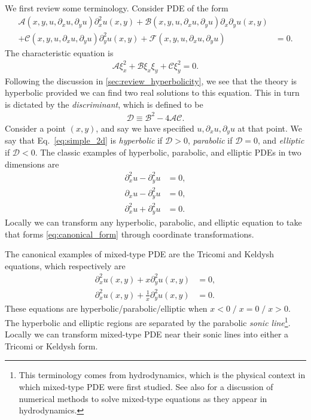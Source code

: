 \documentclass{ws-ijmpd}
\begin{document}
We first review some terminology\cite{evans2010partial}.
Consider PDE of the form
\begin{align}
\label{eq:simple_2d}
   \mathcal{A}\left(x,y,u,\partial_xu,\partial_yu\right)\partial_x^2u(x,y)
   +
   \mathcal{B}\left(x,y,u,\partial_xu,\partial_yu\right)\partial_x\partial_yu(x,y)
   &
   \nonumber\\
   +
   \mathcal{C}\left(x,y,u,\partial_xu,\partial_yu\right)\partial_y^2u(x,y)
   +
   \mathcal{F}\left(x,y,u,\partial_xu,\partial_yu\right)
   &=
   0
   .
\end{align}
The characteristic equation is
\begin{align}
   \mathcal{A}\xi_x^2
   +
   \mathcal{B}\xi_x\xi_y
   +
   \mathcal{C}\xi_y^2
   =
   0
   .
\end{align}
Following the discussion in \ref{sec:review_hyperbolicity}, we see that
the theory is hyperbolic provided we can find two real solutions to this
equation.
This in turn is dictated by the \emph{discriminant}, which is defined to be
\begin{align}
   \mathcal{D}
   \equiv
   \mathcal{B}^2
   -
   4\mathcal{A}\mathcal{C}
   .
\end{align}
Consider a point $(x,y)$, and say we have specified
$u,\partial_xu,\partial_yu$ at that point.
We say that Eq.~\eqref{eq:simple_2d} is
\emph{hyperbolic} if $\mathcal{D}>0$, \emph{parabolic} if $\mathcal{D}=0$,
and \emph{elliptic} if $\mathcal{D}<0$.
The classic examples of hyperbolic, parabolic, and elliptic PDEs in two
dimensions are
\begin{subequations}
\label{eq:canonical_form}
\begin{align}
   \partial_x^2u - \partial_y^2u
   &=
   0
   ,\\
   \partial_xu - \partial_y^2u
   &=
   0
   ,\\
   \partial_x^2u + \partial_y^2u
   &=
   0
   .
\end{align}
\end{subequations}
Locally we can transform any hyperbolic, parabolic, and elliptic
equation to take that forms \eqref{eq:canonical_form}
through coordinate transformations.

The canonical examples of mixed-type PDE are the Tricomi
and Keldysh equations\cite{chen2015tricomi}, which respectively are 
\begin{align}
   \partial_x^2u(x,y)
   +
   x
   \partial_y^2u(x,y)
   &=
   0
   ,\\
   \partial_x^2u(x,y)
   +
   \frac{1}{x}
   \partial_y^2u(x,y)
   &=
   0
   .
\end{align}
These equations are hyperbolic/parabolic/elliptic when 
$x<0 \; / \; x=0 \; / \; x > 0$.
The hyperbolic and elliptic regions are separated by the parabolic
\emph{sonic line}\footnote{This terminology comes from hydrodynamics,
which is the physical context in which mixed-type PDE were
first studied\cite{bams/1183548680,doi:10.1142/S0219891604000081}.
See also  for a discussion of numerical
methods to solve mixed-type equations as they appear in
hydrodynamics.}.
Locally we can transform mixed-type PDE near their sonic lines
into either a Tricomi or Keldysh form.
\end{document}
